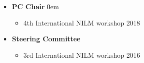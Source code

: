 \documentclass[letter,10pt]{article}
\begin{document}
\begin{itemize}
    \item[] \textbf{PC Chair}
\itemsep0em 
    \begin{itemize}
        \item 4th International NILM workshop 2018
    \end{itemize}
    
     \item[] \textbf{Steering Committee}
    \begin{itemize}
        \item 3rd International NILM workshop 2016
\end{itemize}

\end{itemize}
\end{document}
